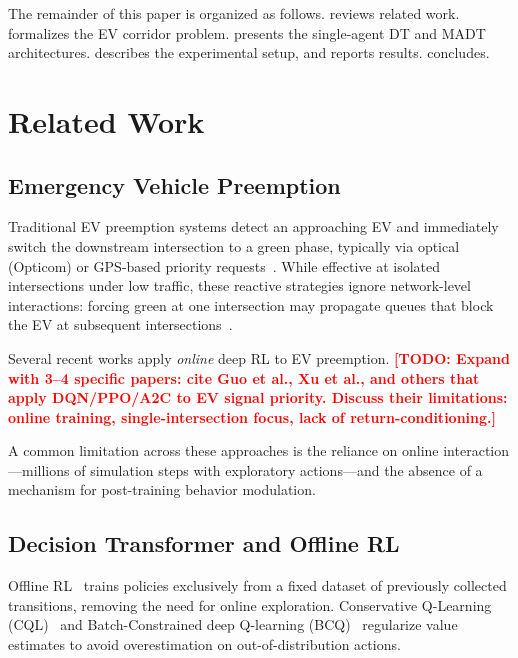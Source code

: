 \documentclass[journal]{IEEEtran}
\newcommand{\todo}[1]{\textcolor{red}{\textbf{[TODO: #1]}}}
\begin{document}
The remainder of this paper is organized as follows.
 reviews related work.  
formalizes the EV corridor problem.   presents the
single-agent DT and MADT architectures.   describes
the experimental setup, and  reports results.
 concludes.

\section{Related Work}
\label{sec:related}

\subsection{Emergency Vehicle Preemption}
\label{sec:related:evp}

Traditional EV preemption systems detect an approaching EV and
immediately switch the downstream intersection to a green phase,
typically via optical (Opticom) or GPS-based priority
requests~\cite{qin2012control}.  While effective at isolated
intersections under low traffic, these reactive strategies ignore
network-level interactions: forcing green at one intersection may
propagate queues that block the EV at subsequent
intersections~\cite{wang2022ev}.

Several recent works apply \emph{online} deep RL to EV preemption.
\todo{Expand with 3--4 specific papers: cite Guo et al., Xu et al.,
and others that apply DQN/PPO/A2C to EV signal priority.  Discuss
their limitations: online training, single-intersection focus, lack of
return-conditioning.}

A common limitation across these approaches is the reliance on online
interaction---millions of simulation steps with exploratory
actions---and the absence of a mechanism for post-training behavior
modulation.

\subsection{Decision Transformer and Offline RL}
\label{sec:related:dt}

Offline RL~\cite{levine2020offline} trains policies exclusively from a
fixed dataset of previously collected transitions, removing the need
for online exploration.  Conservative Q-Learning
(CQL)~\cite{kumar2020conservative} and Batch-Constrained deep
Q-learning (BCQ)~\cite{fujimoto2019off} regularize value estimates to
avoid overestimation on out-of-distribution actions.
\end{document}
